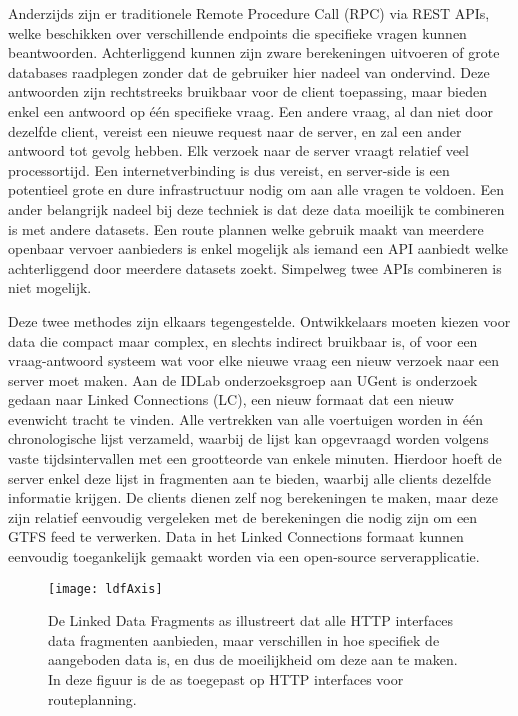 Anderzijds zijn er traditionele Remote Procedure Call (RPC) via REST APIs, welke beschikken over verschillende endpoints die specifieke vragen kunnen beantwoorden. Achterliggend kunnen zijn zware berekeningen uitvoeren of grote databases raadplegen zonder dat de gebruiker hier nadeel van ondervind. Deze antwoorden zijn rechtstreeks bruikbaar voor de client toepassing, maar bieden enkel een antwoord op één specifieke vraag. Een andere vraag, al dan niet door dezelfde client, vereist een nieuwe request naar de server, en zal een ander antwoord tot gevolg hebben. Elk verzoek naar de server vraagt relatief veel processortijd. Een internetverbinding is dus vereist, en server-side is een potentieel grote en dure infrastructuur nodig om aan alle vragen te voldoen. Een ander belangrijk nadeel bij deze techniek is dat deze data moeilijk te combineren is met andere datasets. Een route plannen welke gebruik maakt van meerdere openbaar vervoer aanbieders is enkel mogelijk als iemand een API aanbiedt welke achterliggend door meerdere datasets zoekt. Simpelweg twee APIs combineren is niet mogelijk.

Deze twee methodes zijn elkaars tegengestelde. Ontwikkelaars moeten kiezen voor data die compact maar complex, en slechts indirect bruikbaar is, of voor een vraag-antwoord systeem wat voor elke nieuwe vraag een nieuw verzoek naar een server moet maken. Aan de IDLab onderzoeksgroep aan UGent is onderzoek gedaan naar Linked Connections (LC), een nieuw formaat dat een nieuw evenwicht tracht te vinden. Alle vertrekken van alle voertuigen worden in één chronologische lijst verzameld, waarbij de lijst kan opgevraagd worden volgens vaste tijdsintervallen met een grootteorde van enkele minuten. Hierdoor hoeft de server enkel deze lijst in fragmenten aan te bieden, waarbij alle clients dezelfde informatie krijgen. De clients dienen zelf nog berekeningen te maken, maar deze zijn relatief eenvoudig vergeleken met de berekeningen die nodig zijn om een GTFS feed te verwerken. Data in het Linked Connections formaat kunnen eenvoudig toegankelijk gemaakt worden via een open-source serverapplicatie.

\begin{figure}
	\centering
		\texttt{[image: ldfAxis]}
	\caption[Routeplanning HTTP interfaces op de LDF as]{De Linked Data Fragments as illustreert dat alle HTTP interfaces data fragmenten aanbieden, maar verschillen in hoe specifiek de aangeboden data is, en dus de moeilijkheid om deze aan te maken\citep{verborgh14}. In deze figuur is de as toegepast op HTTP interfaces voor routeplanning\citep{colpaert15}.}
	\label{fig:ldfAxis}
\end{figure}

